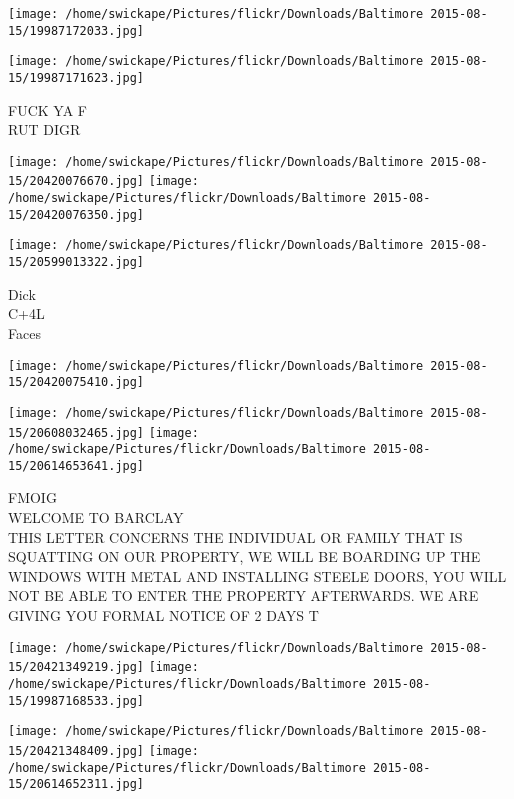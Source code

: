 \documentclass[10pt,letterpaper]{article}
\begin{document}
\texttt{[image: /home/swickape/Pictures/flickr/Downloads/Baltimore 2015-08-15/19987172033.jpg]}

\vspace{0.25in}
\texttt{[image: /home/swickape/Pictures/flickr/Downloads/Baltimore 2015-08-15/19987171623.jpg]}

FUCK YA F\\
RUT DIGR\\
\pagebreak

\texttt{[image: /home/swickape/Pictures/flickr/Downloads/Baltimore 2015-08-15/20420076670.jpg]}
\texttt{[image: /home/swickape/Pictures/flickr/Downloads/Baltimore 2015-08-15/20420076350.jpg]}

\texttt{[image: /home/swickape/Pictures/flickr/Downloads/Baltimore 2015-08-15/20599013322.jpg]}

Dick\\
C+4L\\
Faces\\
\pagebreak

\texttt{[image: /home/swickape/Pictures/flickr/Downloads/Baltimore 2015-08-15/20420075410.jpg]}

\vspace{0.25in}
\texttt{[image: /home/swickape/Pictures/flickr/Downloads/Baltimore 2015-08-15/20608032465.jpg]}
\texttt{[image: /home/swickape/Pictures/flickr/Downloads/Baltimore 2015-08-15/20614653641.jpg]}

FMOIG\\
WELCOME TO BARCLAY\\
THIS LETTER CONCERNS THE INDIVIDUAL OR FAMILY THAT IS SQUATTING ON OUR PROPERTY, WE WILL BE BOARDING UP THE WINDOWS WITH METAL AND INSTALLING STEELE DOORS, YOU WILL NOT BE ABLE TO ENTER THE PROPERTY AFTERWARDS.  WE ARE GIVING YOU FORMAL NOTICE OF 2 DAYS T\\
\pagebreak

\texttt{[image: /home/swickape/Pictures/flickr/Downloads/Baltimore 2015-08-15/20421349219.jpg]}
\texttt{[image: /home/swickape/Pictures/flickr/Downloads/Baltimore 2015-08-15/19987168533.jpg]}

\texttt{[image: /home/swickape/Pictures/flickr/Downloads/Baltimore 2015-08-15/20421348409.jpg]}
\texttt{[image: /home/swickape/Pictures/flickr/Downloads/Baltimore 2015-08-15/20614652311.jpg]}
\end{document}
